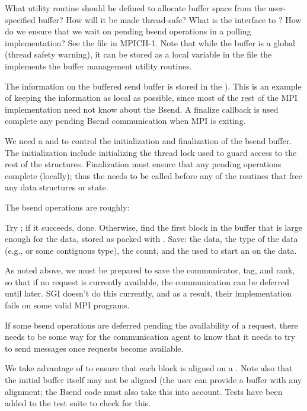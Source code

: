 \documentclass{article}
\begin{document}
What utility routine should be defined to allocate buffer space from the
user-specified buffer?  How will it be made thread-safe?  What is the
interface to ?  How do we ensure that we wait on
pending bsend operations in a polling implementation?  See the file
 in MPICH-1.  Note that while the buffer is
a global (thread safety warning),
it can be stored as a local 
 variable in the file the implements the buffer
management utility routines.

The information on the buffered send buffer is stored in the
).  This is an example of keeping the information as
local as possible, since most of the rest of the MPI implementation
need not know about the Bsend.  A finalize callback is used complete
any pending Bsend communication when MPI is exiting.

We need a  and
 to control the initialization and
finalization of the bsend buffer.  The initialization include
initializing the thread lock used to guard access to the rest of the
structures.   Finalization must ensure that any pending operations
complete (locally); thus the  needs to
be called before any of the routines that free any data structures or state.

The bsend operations are roughly:

Try ; if it succeeds, done.
Otherwise, find the first block in the buffer that is large enough for
the data, stored as packed with .  
Save: the data, the type of the data (e.g.,  or some
contiguous type), the count, and the  used to start
an  on the data.

As noted above, we must be prepared to save the
communicator, tag, and rank, so that if no request is currently
available, the communication can be deferred until later.  SGI doesn't
do this currently, and as a result, their implementation fails on some
valid MPI programs.

If some bsend operations are deferred pending the availability of a
request, there needs to be some way for the communication agent to
know that it needs to try to send messages once requests become
available.


We take advantage of  to ensure that each
block is aligned on a .
Note also that the initial buffer itself may not be aligned (the user
can provide a buffer with any alignment; the Bsend code must also take
this into account.  Tests have been added to the test suite to check
for this.
\end{document}
